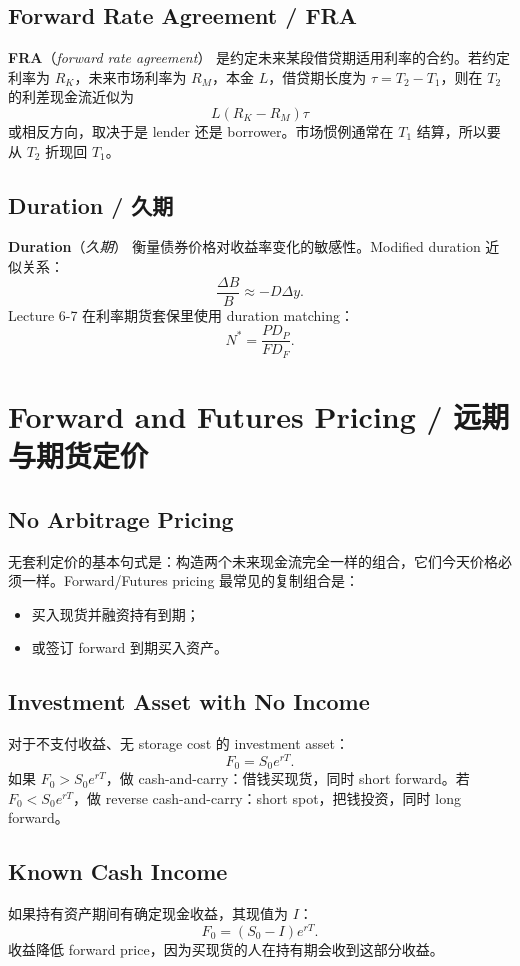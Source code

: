 \documentclass[11pt,a4paper,openany]{ctexbook}
\newcommand{\term}[2]{\textbf{#1}（\emph{#2}）}
\newcommand{\source}[1]{\par\smallskip\noindent{\small\textcolor{muted}{Source: #1}}\par}
\begin{document}
\section{Forward Rate Agreement / FRA}
\term{FRA}{forward rate agreement} 是约定未来某段借贷期适用利率的合约。若约定利率为 $R_K$，未来市场利率为 $R_M$，本金 $L$，借贷期长度为 $\tau=T_2-T_1$，则在 $T_2$ 的利差现金流近似为
\[
L(R_K-R_M)\tau
\]
或相反方向，取决于是 lender 还是 borrower。市场惯例通常在 $T_1$ 结算，所以要从 $T_2$ 折现回 $T_1$。

\section{Duration / 久期}
\term{Duration}{久期} 衡量债券价格对收益率变化的敏感性。Modified duration 近似关系：
\[
\frac{\Delta B}{B}\approx-D\Delta y.
\]
Lecture 6-7 在利率期货套保里使用 duration matching：
\[
N^\ast=\frac{P D_P}{F D_F}.
\]

\chapter{Forward and Futures Pricing / 远期与期货定价}
\source{Lecture 5; Assignment 2; supplementary oil futures case}

\section{No Arbitrage Pricing}
无套利定价的基本句式是：构造两个未来现金流完全一样的组合，它们今天价格必须一样。Forward/Futures pricing 最常见的复制组合是：
\begin{itemize}
  \item 买入现货并融资持有到期；
  \item 或签订 forward 到期买入资产。
\end{itemize}

\section{Investment Asset with No Income}
对于不支付收益、无 storage cost 的 investment asset：
\[
F_0=S_0e^{rT}.
\]
如果 $F_0>S_0e^{rT}$，做 cash-and-carry：借钱买现货，同时 short forward。若 $F_0<S_0e^{rT}$，做 reverse cash-and-carry：short spot，把钱投资，同时 long forward。

\section{Known Cash Income}
如果持有资产期间有确定现金收益，其现值为 $I$：
\[
F_0=(S_0-I)e^{rT}.
\]
收益降低 forward price，因为买现货的人在持有期会收到这部分收益。
\end{document}
